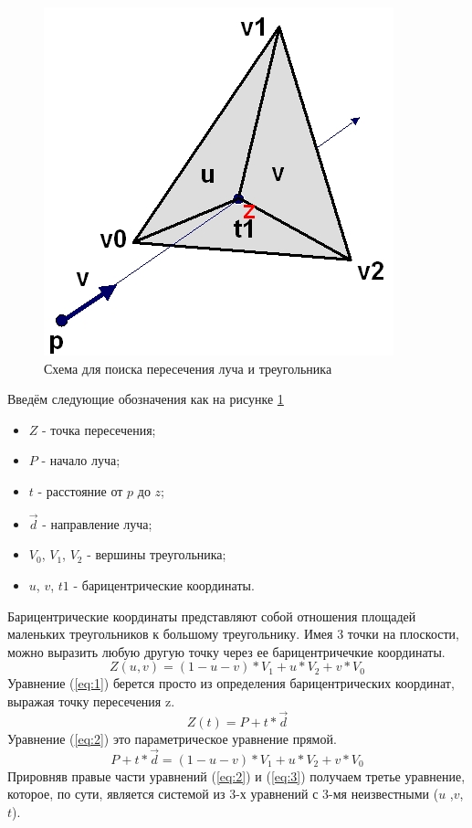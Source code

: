 \documentclass[12pt,a4paper,oneside]{report}
\begin{document}
				\begin{figure}[h]
					\centering
					\includegraphics{intersec}
					\caption{Схема для поиска пересечения луча и треугольника}
					\label{fig:intersec}
				\end{figure}
				
				\quad Введём следующие обозначения как на рисунке \ref{fig:intersec}
				\begin{itemize}
				    \item $Z$ - точка пересечения;
    				\item $P$ - начало луча;
    				\item $t$ - расстояние от $p$ до $z$;
    				\item $\vec{d}$ - направление луча;
    				\item $V_{0}$, $V_{1}$, $V_{2}$ - вершины треугольника;
    				\item $u$, $v$, $t1$ - барицентрические координаты.
    			\end{itemize}
    			\quad Барицентрические координаты представляют собой отношения площадей маленьких треугольников к большому треугольнику. Имея 3 точки на плоскости, можно выразить любую другую точку через ее барицентричечкие координаты. 
    			\begin{equation}
					Z(u, v) = (1 - u - v)*V_{1} + u*V_{2} + v*V_{0}
					\label{eq:1}
				\end{equation}
    			\quad Уравнение (\ref{eq:1}) берется просто из определения барицентрических координат, выражая точку пересечения z.
    			\begin{equation}
					Z(t) = P + t*\vec{d}
					\label{eq:2}
				\end{equation}
    			\quad Уравнение (\ref{eq:2}) это параметрическое уравнение прямой.
    			\begin{equation}
					P + t*\vec{d} = (1 - u - v)*V_{1} + u*V_{2} + v*V_{0}
					\label{eq:3}
				\end{equation}
    			\quad Прировняв правые части уравнений (\ref{eq:2}) и (\ref{eq:3}) получаем третье уравнение, которое, по сути, является системой из 3-х уравнений с 3-мя неизвестными ($u$ ,$v$, $t$).
    			
\end{document}
